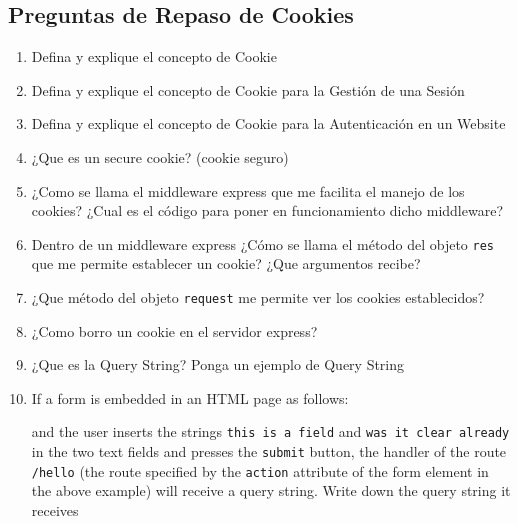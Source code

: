 \subsection{Preguntas de Repaso de
Cookies}\label{preguntas-de-repaso-de-cookies}

\begin{enumerate}
\def\labelenumi{\arabic{enumi}.}
\item
  Defina y explique el concepto de Cookie
\item
  Defina y explique el concepto de Cookie para la Gestión de una Sesión
\item
  Defina y explique el concepto de Cookie para la Autenticación en un
  Website
\item
  ¿Que es un secure cookie? (cookie seguro) 
\item
  ¿Como se llama el middleware express que me facilita el manejo de los
  cookies? ¿Cual es el código para poner en funcionamiento dicho
  middleware? 
\item
  Dentro de un middleware express ¿Cómo se llama el método del objeto
  \texttt{res} que me permite establecer un cookie? ¿Que argumentos
  recibe? 
\item
  ¿Que método del objeto \texttt{request} me permite ver los cookies
  establecidos? 
\item
  ¿Como borro un cookie en el servidor express? 
\item
  ¿Que es la Query String? Ponga un ejemplo de Query String 
\item
  If a form is embedded in an HTML page as follows:

\begin{Shaded}
\begin{Highlighting}[]
\KeywordTok{>}
   \KeywordTok{/>}
   \KeywordTok{/>}
   \KeywordTok{/>}
\end{Highlighting}
\end{Shaded}

  and the user inserts the strings \texttt{this is a field} and
  \texttt{was it clear already} in the two text fields and presses the
  \texttt{submit} button, the handler of the route \texttt{/hello} (the
  route specified by the \texttt{action} attribute of the form element
  in the above example) will receive a query string. Write down the
  query string it receives 
\end{enumerate}
